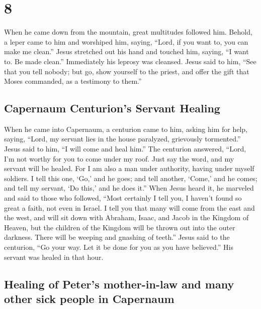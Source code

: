 \hypertarget{section-7}{%
\section{8}\label{section-7}}

 When he came down from the mountain, great multitudes
followed him.  Behold, a leper came to him and worshiped
him, saying, ``Lord, if you want to, you can make me clean.''
 Jesus stretched out his hand and touched him, saying, ``I
want to. Be made clean.'' Immediately his leprosy was cleansed.
 Jesus said to him, ``See that you tell nobody; but go,
show yourself to the priest, and offer the gift that Moses commanded, as
a testimony to them.''

\hypertarget{capernaum-centurions-servant-healing}{%
\subsection{Capernaum Centurion's Servant
Healing}\label{capernaum-centurions-servant-healing}}

 When he came into Capernaum, a centurion came to him,
asking him for help,  saying, ``Lord, my servant lies in
the house paralyzed, grievously tormented.''  Jesus said
to him, ``I will come and heal him.''  The centurion
answered, ``Lord, I'm not worthy for you to come under my roof. Just say
the word, and my servant will be healed.  For I am also a
man under authority, having under myself soldiers. I tell this one,
`Go,' and he goes; and tell another, `Come,' and he comes; and tell my
servant, `Do this,' and he does it.''  When Jesus heard
it, he marveled and said to those who followed, ``Most certainly I tell
you, I haven't found so great a faith, not even in Israel.
 I tell you that many will come from the east and the
west, and will sit down with Abraham, Isaac, and Jacob in the Kingdom of
Heaven,  but the children of the Kingdom will be thrown
out into the outer darkness. There will be weeping and gnashing of
teeth.''  Jesus said to the centurion, ``Go your way. Let
it be done for you as you have believed.'' His servant was healed in
that hour.

\hypertarget{healing-of-peters-mother-in-law-and-many-other-sick-people-in-capernaum}{%
\subsection{Healing of Peter's mother-in-law and many other sick people
in
Capernaum}\label{healing-of-peters-mother-in-law-and-many-other-sick-people-in-capernaum}}

